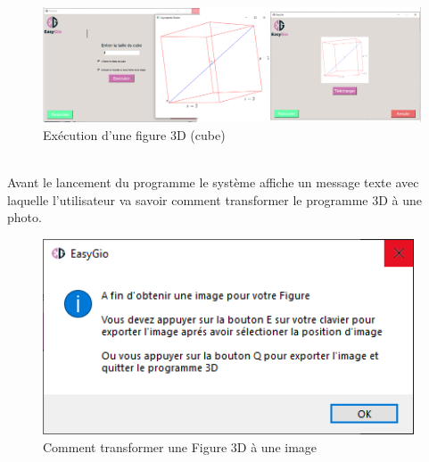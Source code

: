 \documentclass[a4paper]{report}
\begin{document}
\begin{figure}[!h]
    \centering
    \includegraphics[width=15cm]{images/CubeT.PNG}
    \caption{Exécution d'une figure 3D (cube)}
    \label{fig:Exécution d'un figure 3D (cube)}
\end{figure}\\
Avant le lancement du programme le système affiche un message texte  avec laquelle l'utilisateur va savoir comment transformer le programme 3D à une photo.\\
\begin{figure}[!h]
    \centering
    \includegraphics[width=11cm]{images/3DToImage.PNG}
    \caption{Comment transformer une Figure 3D à une image}
    \label{fig:Comment transformer une Figure 3D à une image}
\end{figure}
\newpage
\end{document}
